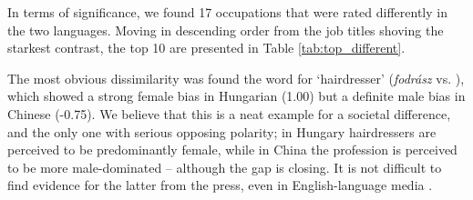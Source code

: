 \documentclass[11pt]{article}
\newcommand{\zh}[1]{\simplifiedchinesefont{#1}\rmfamily}
\begin{document}



In terms of significance, we found 17 occupations that were rated differently in the two languages. Moving in descending order from the job titles shoving the starkest contrast, the top 10 are presented in Table \ref{tab:top_different}.

The most obvious dissimilarity was found the word for `hairdresser' (\textit{fodrász} vs. \zh{理发师}), which showed a strong female bias in Hungarian (1.00) but a definite male bias in Chinese (-0.75). We believe that this is a neat example for a societal difference, and the only one with serious opposing polarity; in Hungary hairdressers are perceived to be predominantly female, while in China the profession is perceived to be more male-dominated -- although the gap is closing. It is not difficult to find evidence for the latter from the press, even in English-language media \citep{nan_2025_women}.
\end{document}
